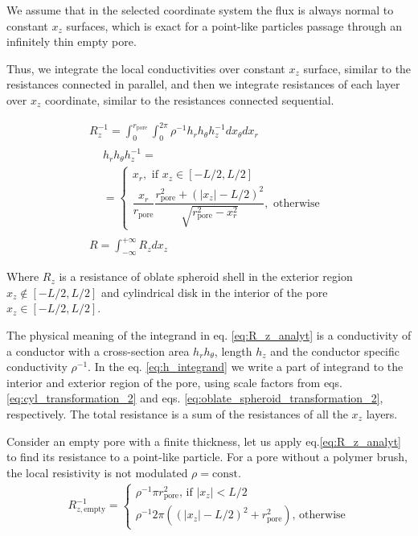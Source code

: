 \documentclass[10pt, a4paper]{article}
\begin{document}
\begin{multicols}{2}
We assume that in the selected coordinate system the flux is always normal to constant $x_z$ surfaces, which is exact for a point-like particles passage through an infinitely thin empty pore.

Thus, we integrate the local conductivities over constant $x_z$ surface, similar to the resistances connected in parallel, and then we integrate resistances of each layer over $x_z$ coordinate, similar to the resistances connected sequential.

\begin{gather}
    \label{eq:R_z_analyt}
    R_z^{-1} = \int_{0}^{r_{\textrm{pore}}} \int_{0}^{2\pi} \rho^{-1} h_r h_{\theta} h_z^{-1} dx_{\theta} dx_r
    \\
    \label{eq:h_integrand}
    \begin{aligned} 
        &h_r h_{\theta} h_z^{-1} = \\ &=
        \begin{cases}
            x_r, \textrm{ if } x_z \in [-L/2,L/2]
            \\[2pt]
            \dfrac{x_r}{r_{\textrm{pore}}}\dfrac{r_{\textrm{pore}}^2 + (|x_z|-L/2)^2}{\sqrt{r_{\textrm{pore}}^2 - x_r^2}}, \textrm{ otherwise}
        \end{cases}
    \end{aligned}
    \\
    \label{eq:R_analyt}
    R = \int_{-\infty}^{+\infty} R_z dx_z
\end{gather}

Where $R_z$ is a resistance of oblate spheroid shell in the exterior region $x_z \notin [-L/2, L/2]$ and cylindrical disk in the interior of the pore $x_z \in [-L/2, L/2]$. 

The physical meaning of the integrand in eq. \ref{eq:R_z_analyt} is a conductivity of a conductor with a cross-section area $h_r h_{\theta}$, length $h_z$ and the conductor specific conductivity $\rho^{-1}$.
In the eq. \ref{eq:h_integrand} we write a part of integrand to the interior and exterior region of the pore, using scale factors from eqs. \ref{eq:cyl_transformation_2} and eqs. \ref{eq:oblate_spheroid_transformation_2}, respectively.
The total resistance is a sum of the resistances of all the $x_z$ layers.

Consider an empty pore with a finite thickness, let us apply eq.\ref{eq:R_z_analyt} to find its resistance to a point-like particle.
For a pore without a polymer brush, the local resistivity is not modulated $\rho = \textrm{const}$.
\begin{gather}
    \label{eq:r_z_empty}
    R_{z, \textrm{empty}}^{-1} = 
    \begin{cases}
        \rho^{-1} \pi r_{\textrm{pore}}^2 \textrm{, if } |x_z| < L/2
        \\
        \rho^{-1} 2 \pi ((|x_z|-L/2)^2 + r_{\textrm{pore}}^2) \textrm{, otherwise} 
    \end{cases}
\end{gather}


\end{multicols}
\end{document}
